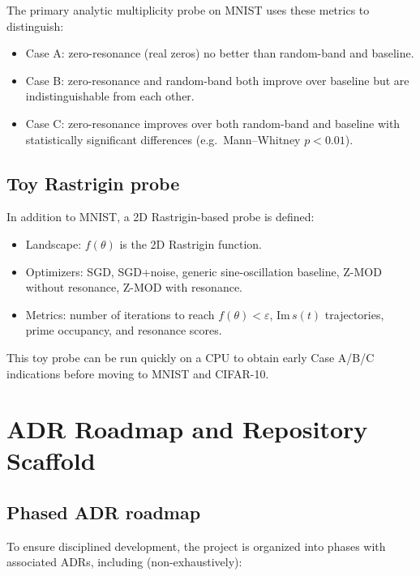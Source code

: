 \documentclass[11pt]{article}
\begin{document}
The primary analytic multiplicity probe on MNIST uses these metrics to distinguish:
\begin{itemize}[leftmargin=*]
  \item Case A: zero-resonance (real zeros) no better than random-band and baseline.
  \item Case B: zero-resonance and random-band both improve over baseline but are indistinguishable from each other.
  \item Case C: zero-resonance improves over both random-band and baseline with statistically significant differences (e.g.\ Mann--Whitney $p<0.01$).
\end{itemize}

\subsection{Toy Rastrigin probe}

In addition to MNIST, a 2D Rastrigin-based probe is defined:

\begin{itemize}[leftmargin=*]
  \item Landscape: $f(\theta)$ is the 2D Rastrigin function.
  \item Optimizers: SGD, SGD+noise, generic sine-oscillation baseline, Z-MOD without resonance, Z-MOD with resonance.
  \item Metrics: number of iterations to reach $f(\theta)< \varepsilon$, $\mathrm{Im}\,s(t)$ trajectories, prime occupancy, and resonance scores.
\end{itemize}

This toy probe can be run quickly on a CPU to obtain early Case A/B/C indications before moving to MNIST and CIFAR-10.

\section{ADR Roadmap and Repository Scaffold}

\subsection{Phased ADR roadmap}

To ensure disciplined development, the project is organized into phases with associated ADRs, including (non-exhaustively):
\end{document}

